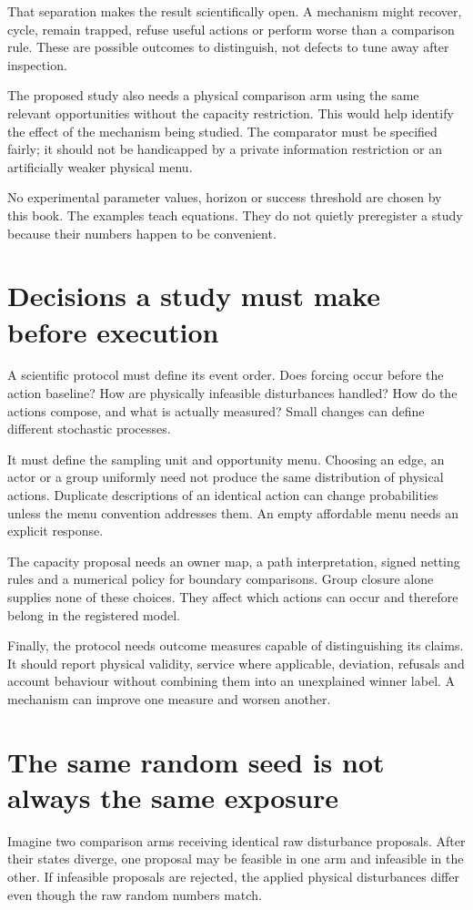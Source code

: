 That separation makes the result scientifically open. A mechanism might recover, cycle, remain trapped, refuse useful actions or perform worse than a comparison rule. These are possible outcomes to distinguish, not defects to tune away after inspection.

The proposed study also needs a physical comparison arm using the same relevant opportunities without the capacity restriction. This would help identify the effect of the mechanism being studied. The comparator must be specified fairly; it should not be handicapped by a private information restriction or an artificially weaker physical menu.

No experimental parameter values, horizon or success threshold are chosen by this book. The examples teach equations. They do not quietly preregister a study because their numbers happen to be convenient.

\section{Decisions a study must make before execution}
A scientific protocol must define its event order. Does forcing occur before the action baseline? How are physically infeasible disturbances handled? How do the actions compose, and what is actually measured? Small changes can define different stochastic processes.

It must define the sampling unit and opportunity menu. Choosing an edge, an actor or a group uniformly need not produce the same distribution of physical actions. Duplicate descriptions of an identical action can change probabilities unless the menu convention addresses them. An empty affordable menu needs an explicit response.

The capacity proposal needs an owner map, a path interpretation, signed netting rules and a numerical policy for boundary comparisons. Group closure alone supplies none of these choices. They affect which actions can occur and therefore belong in the registered model.

Finally, the protocol needs outcome measures capable of distinguishing its claims. It should report physical validity, service where applicable, deviation, refusals and account behaviour without combining them into an unexplained winner label. A mechanism can improve one measure and worsen another.

\section{The same random seed is not always the same exposure}
Imagine two comparison arms receiving identical raw disturbance proposals. After their states diverge, one proposal may be feasible in one arm and infeasible in the other. If infeasible proposals are rejected, the applied physical disturbances differ even though the raw random numbers match.

